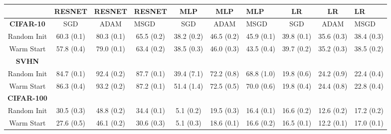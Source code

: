 \begin{tabular}{cccccccccc}
                   & RESNET  & RESNET  & \multicolumn{1}{l}{RESNET} & MLP     & MLP     & \multicolumn{1}{l}{MLP}  & LR      & LR      & \multicolumn{1}{l}{LR}   \\ \hline
\textbf{CIFAR-10}  & SGD     & ADAM    & \multicolumn{1}{l}{MSGD}   & SGD     & ADAM    & \multicolumn{1}{l}{MSGD} & SGD     & ADAM    & \multicolumn{1}{l}{MSGD} \\ \hline
Random Init        & 60.3 (0.1) & 80.3 (0.1) & 65.5 (0.2)                    & 38.2 (0.2) & 46.5 (0.2) & 45.9 (0.1)                  & 39.8 (0.1) & 35.6 (0.3) & 38.4 (0.3)                  \\
Warm Start         & 57.8 (0.4) & 79.0 (0.1) & 63.4 (0.2)                    & 38.5 (0.3) & 46.0 (0.3) & 43.5 (0.4)                  & 39.7 (0.2) & 35.2 (0.3) & 38.5 (0.2)                  \\
\textbf{SVHN}      &         &         & \multicolumn{1}{l}{}       &         &         & \multicolumn{1}{l}{}     &         &         & \multicolumn{1}{l}{}     \\ \hline
Random Init        & 84.7 (0.1) & 92.4 (0.2) & 87.7 (0.1)                    & 39.4 (7.1) & 72.2 (0.8) & 68.8 (1.0)                  & 19.8 (0.6) & 24.2 (0.9) & 22.4 (0.4)                  \\
Warm Start         & 86.3 (0.4) & 93.2 (0.2) & 87.2 (0.1)                    & 51.4 (1.4) & 72.5 (0.5) & 70.0 (0.6)                  & 19.8 (0.4) & 24.4 (0.8) & 22.8 (0.4)                  \\
\textbf{CIFAR-100} &         &         &                            &         &         &                          &         &         &                          \\ \hline
Random Init        & 30.5 (0.3) & 48.8 (0.2) & 34.4 (0.1)                    & 5.1 (0.2) & 19.5 (0.3) & 16.4 (0.1)                  & 16.6 (0.2) & 12.6 (0.2) & 17.2 (0.2)                  \\
Warm Start         & 27.6 (0.5) & 46.1 (0.2) & 30.6 (0.3)                    & 5.1 (0.3) & 18.6 (0.1) & 16.6 (0.2)                  & 16.5 (0.1) & 12.2 (0.1) & 17.0 (0.1)                 
\end{tabular}
